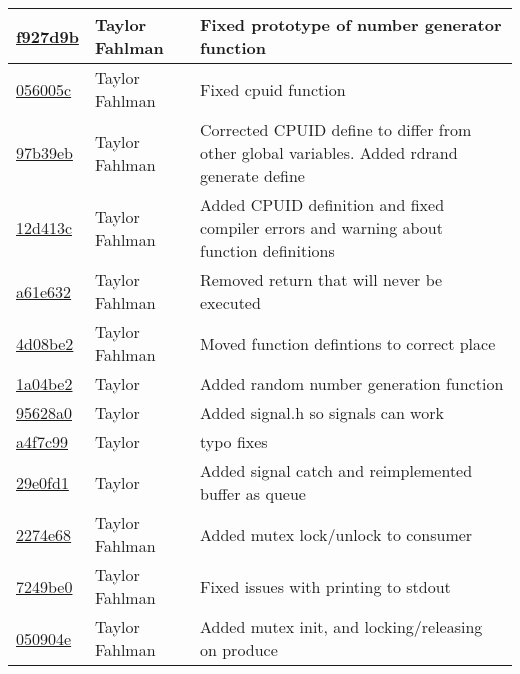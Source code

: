 \begin{tabular}{l l l}
\href{git@github.com:fahlmant/cs444/commit/f927d9b39907620e959c235c9b56ab0160bbc366}{f927d9b} & Taylor Fahlman & Fixed prototype of number generator function\\\hline
\href{git@github.com:fahlmant/cs444/commit/056005ccb725e1ce91c211bb5cc71acdd3cfe5e4}{056005c} & Taylor Fahlman & Fixed cpuid function\\\hline
\href{git@github.com:fahlmant/cs444/commit/97b39ebde5ea4090c9371d7868ec9984c6230703}{97b39eb} & Taylor Fahlman & Corrected CPUID define to differ from other global variables. Added rdrand generate define\\\hline
\href{git@github.com:fahlmant/cs444/commit/12d413cdbc773bea9797fbc8ffc523df368cae5c}{12d413c} & Taylor Fahlman & Added CPUID definition and fixed compiler errors and warning about function definitions\\\hline
\href{git@github.com:fahlmant/cs444/commit/a61e6320173be1ea668966396bb45bc7930d34f9}{a61e632} & Taylor Fahlman & Removed return that will never be executed\\\hline
\href{git@github.com:fahlmant/cs444/commit/4d08be28f8900f197846be9ac81d7c0d4c45cc03}{4d08be2} & Taylor Fahlman & Moved function defintions to correct place\\\hline
\href{git@github.com:fahlmant/cs444/commit/1a04be2d025bdf2f264d2fdcd2dad95ded4fb324}{1a04be2} & Taylor & Added random number generation function\\\hline
\href{git@github.com:fahlmant/cs444/commit/95628a0549663a27c0a3ef1f04118db28e89acda}{95628a0} & Taylor & Added signal.h so signals can work\\\hline
\href{git@github.com:fahlmant/cs444/commit/a4f7c992ec397d9b510126246137537b77e55930}{a4f7c99} & Taylor & typo fixes\\\hline
\href{git@github.com:fahlmant/cs444/commit/29e0fd1c29a38fec3bd5a999d8bf8efa513c70fd}{29e0fd1} & Taylor & Added signal catch and reimplemented buffer as queue\\\hline
\href{git@github.com:fahlmant/cs444/commit/2274e684608cf836dc48bda6d3ec5d5d9b66f5fb}{2274e68} & Taylor Fahlman & Added mutex lock/unlock to consumer\\\hline
\href{git@github.com:fahlmant/cs444/commit/7249be01ba7edbda6723b5acbe59f46efa2886a9}{7249be0} & Taylor Fahlman & Fixed issues with printing to stdout\\\hline
\href{git@github.com:fahlmant/cs444/commit/050904eeb0342d93e297fec347a08544cc99ce07}{050904e} & Taylor Fahlman & Added mutex init, and locking/releasing on produce\\\hline

\end{tabular}
